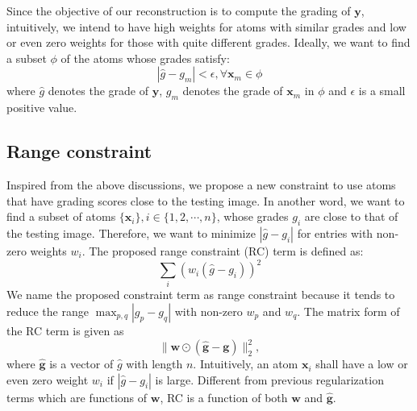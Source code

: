 \documentclass[journal]{IEEEtran}
\begin{document}
Since the objective of our reconstruction is to compute the grading of $\textbf{y}$, intuitively, we intend to have high weights for  atoms with similar grades and low or even zero weights for those with quite different grades. Ideally, we want to find a subset $\phi$ of the atoms whose grades satisfy:
\begin{equation}
   |\hat{g}-g_m| < \epsilon,  \forall \textbf{x}_m \in \phi
\end{equation}
where $\hat{g}$ denotes the grade of $\textbf{y}$, $g_m$ denotes the grade of $\textbf{x}_m$ in $\phi$ and $\epsilon$ is a small positive value.
%
\subsection{Range constraint}
Inspired from the above discussions, we propose a new constraint to use
atoms that have grading scores close to the testing image. In another word, we want to find a
 subset of atoms $\{\textbf{x}_i \}, i\in \{1, 2, \cdots, n\}$, whose grades $g_i$ are close to that of the
 testing image. Therefore, we want to minimize $ |\hat{g}-g_i|$ for entries
 with non-zero weights $w_i$.   The proposed  range constraint (RC) term is defined as:
 \begin{equation}
    \sum_i (w_i(\hat{g}-g_i))^2
 \end{equation}
We name the proposed constraint term as range constraint because it tends to reduce the range
 $\max_{p,q}|g_p-g_q|$  with non-zero $w_p$ and $w_q$.
 The matrix form of the RC term is given as
 \begin{equation}
    \|\textbf{w}\odot (\hat{\textbf{g}} -\textbf{g})  \|_2^2,
 \end{equation}
 where $\hat{\textbf{g}}$ is a vector of $\hat{g}$ with length $n$.
  Intuitively, an atom $\textbf{x}_i$ shall have a low or even zero weight $w_i$ if    $|\hat{g}-g_i|$ is large.  %
 Different from previous regularization terms which are   functions of $\textbf{w}$, RC is a function of both $\textbf{w}$ and $\hat{\textbf{g}}$.
\end{document}
